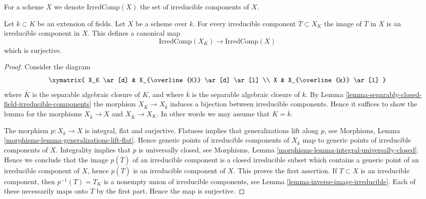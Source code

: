 \noindent
For a scheme $X$ we denote $\text{IrredComp}(X)$ the set of
irreducible components of $X$.

\begin{lemma}
\label{lemma-image-irreducible}
Let $k \subset K$ be an extension of fields.
Let $X$ be a scheme over $k$.
For every irreducible component $\overline{T} \subset X_K$
the image of $\overline{T}$ in $X$ is an irreducible component in $X$.
This defines a canonical map
$$
\text{IrredComp}(X_K)
\longrightarrow
\text{IrredComp}(X)
$$
which is surjective.
\end{lemma}

\begin{proof}
Consider the diagram
$$
\xymatrix{
X_K \ar[d] & X_{\overline{K}} \ar[d] \ar[l] \\
X & X_{\overline{k}} \ar[l]
}
$$
where $\overline{K}$ is the separable algebraic closure of $K$, and
where $\overline{k}$ is the separable algebraic closure of $k$. By
Lemma \ref{lemma-separably-closed-field-irreducible-components}
the morphism $X_{\overline{K}} \to X_{\overline{k}}$ induces
a bijection between irreducible components. Hence it suffices
to show the lemma for the morphisms
$X_{\overline{k}} \to X$ and $X_{\overline{K}} \to X_K$.
In other words we may assume that $K = \overline{k}$.

\medskip\noindent
The morphism $p : X_{\overline{k}} \to X$ is integral, flat and surjective.
Flatness implies that generalizations lift along $p$, see
Morphisms, Lemma \ref{morphisms-lemma-generalizations-lift-flat}.
Hence generic points of irreducible components of $X_{\overline{k}}$
map to generic points of irreducible components of $X$.
Integrality implies that $p$ is universally closed, see
Morphisms, Lemma \ref{morphisms-lemma-integral-universally-closed}.
Hence we conclude that the image $p(\overline{T})$ of an irreducible component
is a closed irreducible subset which contains a generic point of an
irreducible component of $X$, hence $p(\overline{T})$
is an irreducible component of $X$. This proves the first assertion.
If $T \subset X$ is an irreducible component, then $p^{-1}(T) =T_K$
is a nonempty union of irreducible components, see
Lemma \ref{lemma-inverse-image-irreducible}.
Each of these necessarily maps onto $T$ by the first part.
Hence the map is surjective.
\end{proof}

